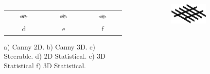 \documentclass[9pt]{beamer}
\begin{document}
\begin{frame}[shrink]
\begin{columns}
\begin{figure}
\begin{tabular}{c c c }
\includegraphics[width=0.30\textwidth]{stat2dmulti.eps}&\includegraphics[width=0.30\textwidth]{T3_11}&\includegraphics[width=0.30\textwidth]{T13_9}\\
d & e & f\\

\end{tabular}
\caption{ a) Canny 2D. b) Canny 3D. c) Steerable. d) 2D Statistical. e) 3D Statistical  f) 3D Statistical.}
\end{figure}
\vspace{-2cm}
\begin{figure}
\includegraphics[width=0.9\textwidth]{multiideal.eps}
\end{figure}
\end{columns}
\end{frame}
\end{document}
